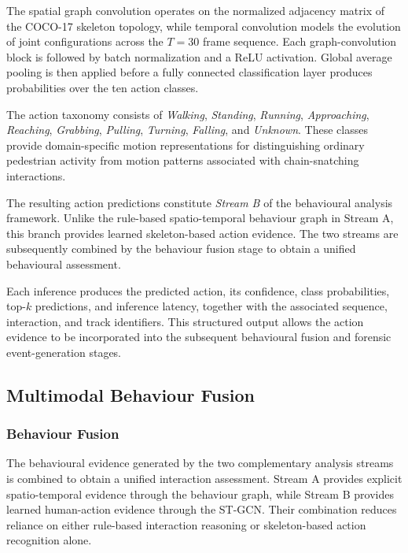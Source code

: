 \documentclass[runningheads]{llncs}
\begin{document}
The spatial graph convolution operates on the normalized adjacency
matrix of the COCO-17 skeleton topology, while temporal convolution
models the evolution of joint configurations across the $T=30$ frame
sequence. Each graph-convolution block is followed by batch
normalization and a ReLU activation. Global average pooling is then
applied before a fully connected classification layer produces
probabilities over the ten action classes.

The action taxonomy consists of \textit{Walking}, \textit{Standing},
\textit{Running}, \textit{Approaching}, \textit{Reaching},
\textit{Grabbing}, \textit{Pulling}, \textit{Turning}, \textit{Falling},
and \textit{Unknown}. These classes provide domain-specific motion
representations for distinguishing ordinary pedestrian activity from
motion patterns associated with chain-snatching interactions.

The resulting action predictions constitute \textit{Stream B} of the
behavioural analysis framework. Unlike the rule-based spatio-temporal
behaviour graph in Stream A, this branch provides learned skeleton-based
action evidence. The two streams are subsequently combined by the
behaviour fusion stage to obtain a unified behavioural assessment.

Each inference produces the predicted action, its confidence, class
probabilities, top-$k$ predictions, and inference latency, together with
the associated sequence, interaction, and track identifiers. This
structured output allows the action evidence to be incorporated into the
subsequent behavioural fusion and forensic event-generation stages.

\subsection{Multimodal Behaviour Fusion}

\subsubsection{Behaviour Fusion}

The behavioural evidence generated by the two complementary analysis
streams is combined to obtain a unified interaction assessment. Stream A
provides explicit spatio-temporal evidence through the behaviour graph,
while Stream B provides learned human-action evidence through the
ST-GCN. Their combination reduces reliance on either rule-based
interaction reasoning or skeleton-based action recognition alone.
\end{document}

